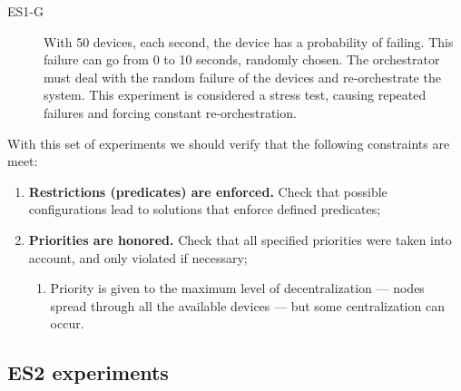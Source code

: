 \begin{description}
    \item[ES1-G] With 50 devices, each second, the device has a probability of failing. This failure can go from 0 to 10 seconds, randomly chosen. The orchestrator must deal with the random failure of the devices and re-orchestrate the system. This experiment is considered a stress test, causing repeated failures and forcing constant re-orchestration.
\end{description}

With this set of experiments we should verify that the following constraints are meet:
\begin{enumerate}
    \item \textbf{Restrictions (predicates) are enforced.} Check that possible configurations lead to solutions that enforce defined predicates;
    \item \textbf{Priorities are honored.} Check that all specified priorities were taken into account, and only violated if necessary;
        \begin{enumerate}
            \item Priority is given to the maximum level of decentralization --- nodes spread through all the available devices --- but some centralization can occur.
        \end{enumerate}
\end{enumerate}

\subsection{ES2 experiments}

